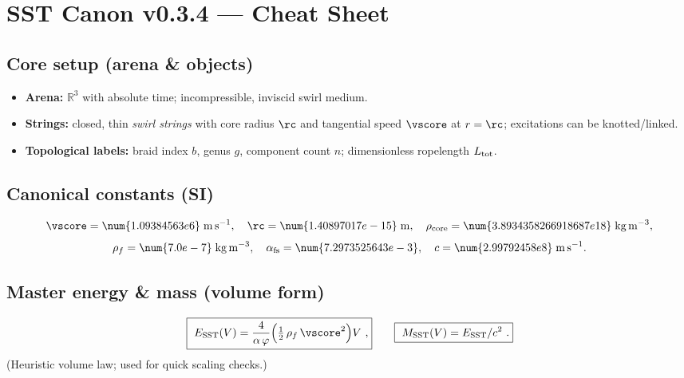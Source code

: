 \documentclass[11pt]{article}
\begin{document}

\section*{SST Canon v0.3.4 — Cheat Sheet}

    \subsection*{Core setup (arena \& objects)}
        \begin{itemize}
        \item \textbf{Arena:} $\mathbb{R}^3$ with absolute time; incompressible, inviscid swirl medium.
        \item \textbf{Strings:} closed, thin \emph{swirl strings} with core radius $\rc$ and tangential speed $\vscore$ at $r=\rc$; excitations can be knotted/linked.
        \item \textbf{Topological labels:} braid index $b$, genus $g$, component count $n$; dimensionless ropelength $L_{\rm tot}$.
        \end{itemize}

    \subsection*{Canonical constants (SI)}
        \[
            \vscore=\num{1.09384563e6}\;\mathrm{m\,s^{-1}},\quad
            \rc=\num{1.40897017e-15}\;\mathrm{m},\quad
            \rho_{\rm core}=\num{3.8934358266918687e18}\;\mathrm{kg\,m^{-3}},
        \]
        \[
            \rho_f=\num{7.0e-7}\;\mathrm{kg\,m^{-3}},\quad
            \alpha_{\rm fs}=\num{7.2973525643e-3},\quad
            c=\num{2.99792458e8}\;\mathrm{m\,s^{-1}}.
        \]

    \subsection*{Master energy \& mass (volume form)}
        \[
            \boxed{~E_{\rm SST}(V)=\frac{4}{\alpha\,\varphi}\Big(\tfrac12\,\rho_f\,\vscore^2\Big)V~,}
            \qquad
            \boxed{~M_{\rm SST}(V)=E_{\rm SST}/c^2~.}
        \]
        (Heuristic volume law; used for quick scaling checks.)
\end{document}
